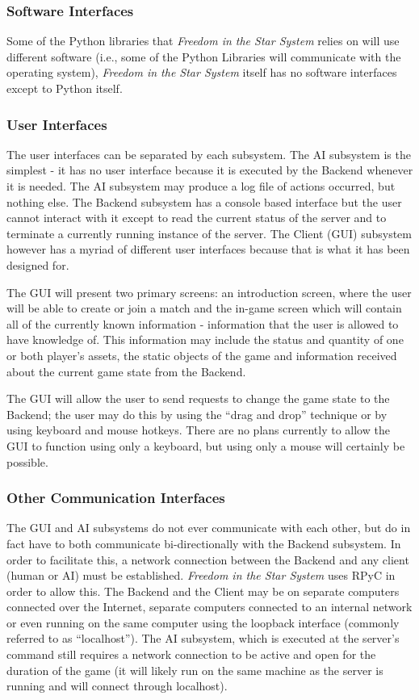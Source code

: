 \documentclass[twoside,letterpaper]{article}
\begin{document}
\subsubsection{Software Interfaces}
Some of the Python libraries that \textit{Freedom in the Star System} relies on will use different software (i.e., some of the Python Libraries will communicate with the operating system), \textit{Freedom in the Star System} itself has no software interfaces except to Python itself.

\subsubsection{User Interfaces}
The user interfaces can be separated by each subsystem.  The AI subsystem is the simplest - it has no user interface because it is executed by the Backend whenever it is needed.  The AI subsystem may produce a log file of actions occurred, but nothing else.  The Backend subsystem has a console based interface but the user cannot interact with it except to read the current status of the server and to terminate a currently running instance of the server.  The Client (GUI) subsystem however has a myriad of different user interfaces because that is what it has been designed for.  

The GUI will present two primary screens: an introduction screen, where the user will be able to create or join a match and the in-game screen which will contain all of the currently known information - information that the user is allowed to have knowledge of.  This information may include the status and quantity of one or both player's assets, the static objects of the game and information received about the current game state from the Backend.

The GUI will allow the user to send requests to change the game state to the Backend; the user may do this by using the ``drag and drop'' technique or by using keyboard and mouse hotkeys.  There are no plans currently to allow the GUI to function using only a keyboard, but using only a mouse will certainly be possible.

\subsubsection{Other Communication Interfaces}
The GUI and AI subsystems do not ever communicate with each other, but do in fact have to both communicate bi-directionally with the Backend subsystem.  In order to facilitate this, a network connection between the Backend and any client (human or AI) must be established.  \textit{Freedom in the Star System} uses RPyC in order to allow this.  The Backend and the Client may be on separate computers connected over the Internet, separate computers connected to an internal network or even running on the same computer using the loopback interface (commonly referred to as ``localhost'').  The AI subsystem, which is executed at the server's command still requires a network connection to be active and open for the duration of the game (it will likely run on the same machine as the server is running and will connect through localhost).
\end{document}
